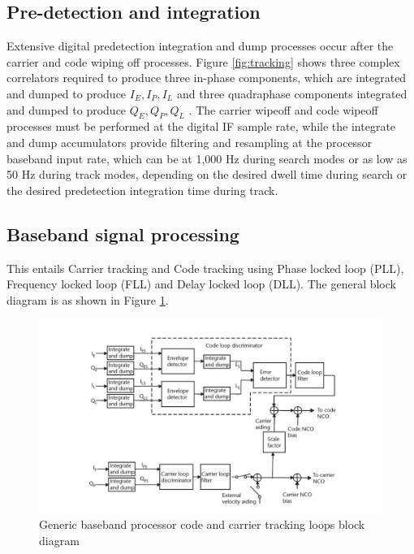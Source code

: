 \subsection{Pre-detection and integration}
Extensive digital predetection integration and dump processes occur after the carrier and code wiping off processes. Figure \ref{fig:tracking} shows three complex correlators required to produce three in-phase
components, which are integrated and dumped to produce $I_E , I_P , I_L$ and three quadraphase components integrated and dumped to produce $Q_E , Q_P , Q_L$ . The carrier wipeoff and code wipeoff processes must be performed at the digital IF sample rate, while the integrate and dump accumulators provide filtering and resampling at the processor baseband input rate, which can be at 1,000 Hz during search modes or as low as 50 Hz during
track modes, depending on the desired dwell time during search or the desired predetection integration time during track.
\subsection{Baseband signal processing}
This entails Carrier tracking and Code tracking using Phase locked loop (PLL), Frequency locked loop (FLL) and Delay locked loop (DLL). The general block diagram is as shown in Figure \ref{fig:Carrier_Code_Tracking}. 

\begin{normalsize}
	\begin{figure}[ht]
		\centering
		\includegraphics[width=1\columnwidth]{figs/tracking_loop}
		\centering
		\captionsetup{justification=centering}
		\caption{Generic baseband processor code and carrier tracking loops block diagram}
		\label{fig:Carrier_Code_Tracking}
	\end{figure}
\end{normalsize}

